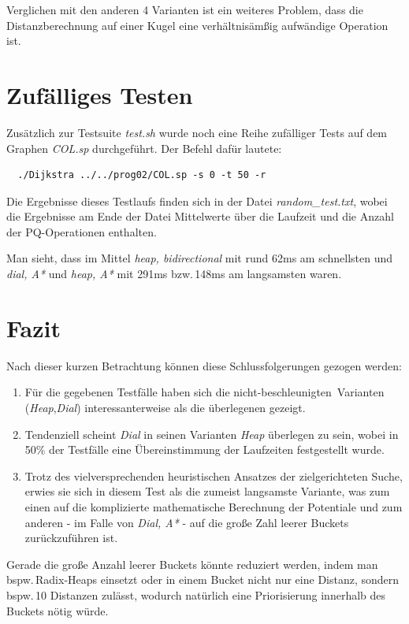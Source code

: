 \documentclass{scrartcl}
\begin{document}
Verglichen mit den anderen 4 Varianten ist ein weiteres Problem, dass die 
Distanzberechnung auf einer Kugel eine verhältnisämßig aufwändige Operation 
ist.

\section{Zufälliges Testen}

Zusätzlich zur Testsuite \emph{test.sh} wurde noch eine Reihe zufälliger
Tests auf dem Graphen \emph{COL.sp} durchgeführt.
Der Befehl dafür lautete:
\begin{verbatim}
  ./Dijkstra ../../prog02/COL.sp -s 0 -t 50 -r
\end{verbatim}
Die Ergebnisse dieses Testlaufs finden sich in der Datei \emph{random\_test.txt},
wobei die Ergebnisse am Ende der Datei Mittelwerte über die Laufzeit und
die Anzahl der PQ-Operationen enthalten.

Man sieht, dass im Mittel \emph{heap, bidirectional} mit rund 62ms am 
schnellsten und \emph{dial, A*} und \emph{heap, A*} mit 291ms bzw.\,148ms am
langsamsten waren.

\section{Fazit}

Nach dieser kurzen Betrachtung können diese Schlussfolgerungen gezogen werden:
\begin{enumerate}
  \item Für die gegebenen Testfälle haben sich die 
        \glqq nicht-beschleunigten\grqq\ Varianten 
        (\emph{Heap},\emph{Dial}) interessanterweise als die überlegenen
        gezeigt.
  \item Tendenziell scheint \emph{Dial} in seinen Varianten \emph{Heap}
        überlegen zu sein, wobei in 50\% der Testfälle eine Übereinstimmung der
        Laufzeiten festgestellt wurde.
  \item Trotz des vielversprechenden heuristischen Ansatzes der zielgerichteten
        Suche, erwies sie sich in diesem Test als die zumeist langsamste 
        Variante, was zum einen auf die komplizierte mathematische Berechnung
        der Potentiale und zum anderen - im Falle von \emph{Dial, A*} - 
        auf die große Zahl leerer Buckets zurückzuführen ist.
\end{enumerate}

Gerade die große Anzahl leerer Buckets könnte reduziert werden, indem man
bspw.\,Radix-Heaps einsetzt oder in einem Bucket nicht nur eine Distanz,
sondern bspw.\,10 Distanzen zulässt, wodurch natürlich eine Priorisierung 
innerhalb des Buckets nötig würde.
\end{document}
